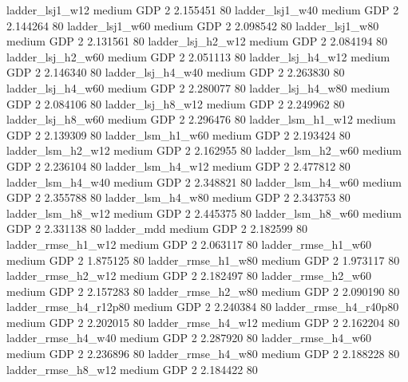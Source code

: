        ladder_lsj1_w12     medium      GDP                 2 2.155451 80
       ladder_lsj1_w40     medium      GDP                 2 2.144264 80
       ladder_lsj1_w60     medium      GDP                 2 2.098542 80
       ladder_lsj1_w80     medium      GDP                 2 2.131561 80
     ladder_lsj_h2_w12     medium      GDP                 2 2.084194 80
     ladder_lsj_h2_w60     medium      GDP                 2 2.051113 80
     ladder_lsj_h4_w12     medium      GDP                 2 2.146340 80
     ladder_lsj_h4_w40     medium      GDP                 2 2.263830 80
     ladder_lsj_h4_w60     medium      GDP                 2 2.280077 80
     ladder_lsj_h4_w80     medium      GDP                 2 2.084106 80
     ladder_lsj_h8_w12     medium      GDP                 2 2.249962 80
     ladder_lsj_h8_w60     medium      GDP                 2 2.296476 80
     ladder_lsm_h1_w12     medium      GDP                 2 2.139309 80
     ladder_lsm_h1_w60     medium      GDP                 2 2.193424 80
     ladder_lsm_h2_w12     medium      GDP                 2 2.162955 80
     ladder_lsm_h2_w60     medium      GDP                 2 2.236104 80
     ladder_lsm_h4_w12     medium      GDP                 2 2.477812 80
     ladder_lsm_h4_w40     medium      GDP                 2 2.348821 80
     ladder_lsm_h4_w60     medium      GDP                 2 2.355788 80
     ladder_lsm_h4_w80     medium      GDP                 2 2.343753 80
     ladder_lsm_h8_w12     medium      GDP                 2 2.445375 80
     ladder_lsm_h8_w60     medium      GDP                 2 2.331138 80
            ladder_mdd     medium      GDP                 2 2.182599 80
    ladder_rmse_h1_w12     medium      GDP                 2 2.063117 80
    ladder_rmse_h1_w60     medium      GDP                 2 1.875125 80
    ladder_rmse_h1_w80     medium      GDP                 2 1.973117 80
    ladder_rmse_h2_w12     medium      GDP                 2 2.182497 80
    ladder_rmse_h2_w60     medium      GDP                 2 2.157283 80
    ladder_rmse_h2_w80     medium      GDP                 2 2.090190 80
 ladder_rmse_h4_r12p80     medium      GDP                 2 2.240384 80
 ladder_rmse_h4_r40p80     medium      GDP                 2 2.202015 80
    ladder_rmse_h4_w12     medium      GDP                 2 2.162204 80
    ladder_rmse_h4_w40     medium      GDP                 2 2.287920 80
    ladder_rmse_h4_w60     medium      GDP                 2 2.236896 80
    ladder_rmse_h4_w80     medium      GDP                 2 2.188228 80
    ladder_rmse_h8_w12     medium      GDP                 2 2.184422 80
